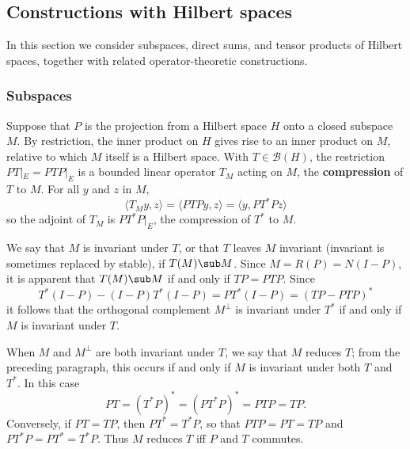\subsection{Constructions with Hilbert spaces}
In this section we consider subspaces, direct sums, and tensor products of Hilbert spaces, together with related operator-theoretic constructions.
\subsubsection{Subspaces}
Suppose that $P$ is the projection from a Hilbert space $H$ onto a closed subspace $M$. By restriction, the inner product on $H$ gives rise to an inner product on $M$, relative to which $M$ itself is a Hilbert space. With $T\in\mathcal{B}(H)$, the restriction $PT|_{E}=PTP|_{E}$ is a bounded linear operator $T_M$ acting on $M$, the \textbf{compression} of $T$ to $M$. For all $y$ and $z$ in $M$,
\[\langle T_My,z\rangle=\langle PTPy,z\rangle=\langle y,PT^*Pz\rangle\]
so the adjoint of $T_M$ is $PT^*P|_{E}$, the compression of $T^*$ to $M$.\par
We say that $M$ is invariant under $T$, or that $T$ leaves $M$ invariant (invariant is sometimes replaced by stable), if $T(M)\sub M$. Since $M=R(P)=N(I-P)$, it is apparent that $T(M)\sub M$ if and only if $TP=PTP$. Since
\[T^*(I-P)-(I-P)T^*(I-P)=PT^*(I-P)=(TP-PTP)^*\]
it follows that the orthogonal complement $M^\bot$ is invariant under $T^*$ if and only if $M$ is invariant under $T$.\par
When $M$ and $M^\bot$ are both invariant under $T$, we say that $M$ reduces $T$; from the preceding paragraph, this occurs if and only if $M$ is invariant under both $T$ and $T^*$. In this case
\[PT=(T^*P)^*=(PT^*P)^*=PTP=TP.\]
Conversely, if $PT=TP$, then $PT^*=T^*P$, so that $PTP=PT=TP$ and $PT^*P=PT^*=T^*P$. Thus $M$ reduces $T$ iff $P$ and $T$ commutes.

